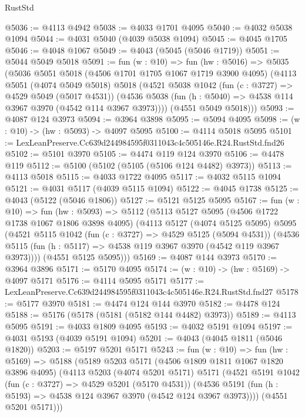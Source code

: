 \begin{lexlean}{RustStd}
\begin{coremodule}
@5036 := @4113 @4942
@5038 := @4033 @1701 @4095
@5040 := @4032 @5038 @1094
@5044 := @4031 @5040 (@4039 @5038 @1094)
@5045 := @4045 @1705
@5046 := @4048 @1067
@5049 := @4043 (@5045 (@5046 @1719))
@5051 := @5044 @5049 @5018
@5091 := fun (w : @10) =>
  fun (hw : @5016) =>
  @5035
    (@5036
      @5051
      @5018
      (@4506 @1701 @1705 @1067 @1719 @3900 @4095)
      (@4113
        @5051
        (@4074 @5049 @5018)
        @5018
        (@4521
          @5038
          @1042
          (fun (c : @3727) => @4529 @5049 (@5017 @4531))
          (@4536 @5038 (fun (h : @5040) => @4538 @114 @3967 @3970 (@4542 @114 @3967 @3973))))
        (@4551 @5049 @5018)))
@5093 := @4087 @124 @3973
@5094 := @3964 @3898
@5095 := @5094 @4095
@5098 := (w : @10) -> (hw : @5093) -> @4097 @5095
@5100 := @4114 @5018 @5095
@5101 := LexLeanPreserve.Cc639d244984595f0311043c4c505146e.R24.RustStd.fnd26
@5102 := @5101 @3970
@5105 := @4474 @119 @124 @3970
@5106 := @4478 @119
@5112 := @5100 (@5102 (@5105 (@5106 @124 @4482) @3973))
@5113 := @4113 @5018
@5115 := @4033 @1722 @4095
@5117 := @4032 @5115 @1094
@5121 := @4031 @5117 (@4039 @5115 @1094)
@5122 := @4045 @1738
@5125 := @4043 (@5122 (@5046 @1806))
@5127 := @5121 @5125 @5095
@5167 := fun (w : @10) =>
  fun (hw : @5093) =>
  @5112
    (@5113
      @5127
      @5095
      (@4506 @1722 @1738 @1067 @1806 @3898 @4095)
      (@4113
        @5127
        (@4074 @5125 @5095)
        @5095
        (@4521
          @5115
          @1042
          (fun (c : @3727) => @4529 @5125 (@5094 @4531))
          (@4536 @5115 (fun (h : @5117) => @4538 @119 @3967 @3970 (@4542 @119 @3967 @3973))))
        (@4551 @5125 @5095)))
@5169 := @4087 @144 @3973
@5170 := @3964 @3896
@5171 := @5170 @4095
@5174 := (w : @10) -> (hw : @5169) -> @4097 @5171
@5176 := @4114 @5095 @5171
@5177 := LexLeanPreserve.Cc639d244984595f0311043c4c505146e.R24.RustStd.fnd27
@5178 := @5177 @3970
@5181 := @4474 @124 @144 @3970
@5182 := @4478 @124
@5188 := @5176 (@5178 (@5181 (@5182 @144 @4482) @3973))
@5189 := @4113 @5095
@5191 := @4033 @1809 @4095
@5193 := @4032 @5191 @1094
@5197 := @4031 @5193 (@4039 @5191 @1094)
@5201 := @4043 (@4045 @1811 (@5046 @1820))
@5203 := @5197 @5201 @5171
@5243 := fun (w : @10) =>
  fun (hw : @5169) =>
  @5188
    (@5189
      @5203
      @5171
      (@4506 @1809 @1811 @1067 @1820 @3896 @4095)
      (@4113
        @5203
        (@4074 @5201 @5171)
        @5171
        (@4521
          @5191
          @1042
          (fun (c : @3727) => @4529 @5201 (@5170 @4531))
          (@4536 @5191 (fun (h : @5193) => @4538 @124 @3967 @3970 (@4542 @124 @3967 @3973))))
        (@4551 @5201 @5171)))

\end{coremodule}
\end{lexlean}
